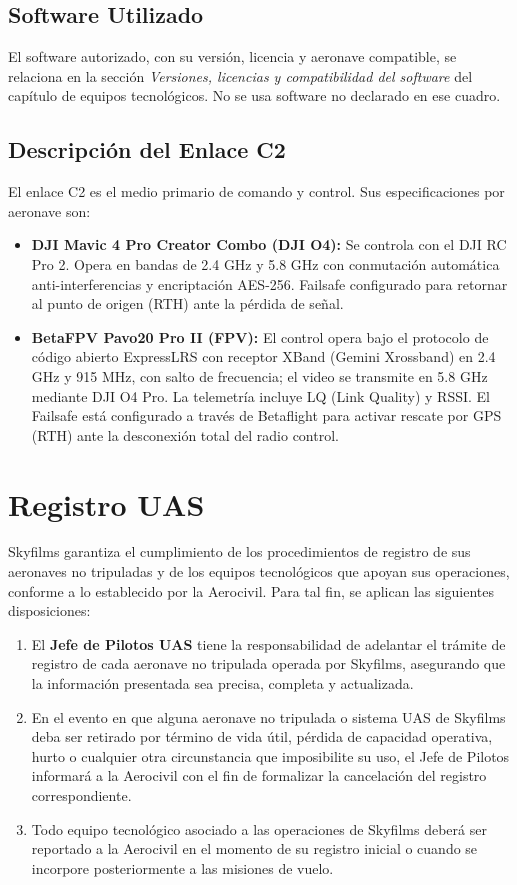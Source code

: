 \subsection{Software Utilizado}
El software autorizado, con su versión, licencia y aeronave compatible, se relaciona en la sección \textit{Versiones, licencias y compatibilidad del software} del capítulo de equipos tecnológicos. No se usa software no declarado en ese cuadro.

\subsection{Descripción del Enlace C2}
El enlace C2 es el medio primario de comando y control. Sus especificaciones por aeronave son:
\begin{itemize}
    \item \textbf{DJI Mavic 4 Pro Creator Combo (DJI O4):} Se controla con el DJI RC Pro 2. Opera en bandas de 2.4 GHz y 5.8 GHz con conmutación automática anti-interferencias y encriptación AES-256. Failsafe configurado para retornar al punto de origen (RTH) ante la pérdida de señal.
    \item \textbf{BetaFPV Pavo20 Pro II (FPV):} El control opera bajo el protocolo de código abierto ExpressLRS con receptor XBand (Gemini Xrossband) en 2.4 GHz y 915 MHz, con salto de frecuencia; el video se transmite en 5.8 GHz mediante DJI O4 Pro. La telemetría incluye LQ (Link Quality) y RSSI. El Failsafe está configurado a través de Betaflight para activar rescate por GPS (RTH) ante la desconexión total del radio control.
\end{itemize}



\section{Registro UAS}


Skyfilms garantiza el cumplimiento de los procedimientos de registro de sus aeronaves no tripuladas y de los equipos tecnológicos que apoyan sus operaciones, conforme a lo establecido por la Aerocivil. Para tal fin, se aplican las siguientes disposiciones:

\begin{enumerate}[label=\alph*)]
    \item El \textbf{Jefe de Pilotos UAS} tiene la responsabilidad de adelantar el trámite de registro de cada aeronave no tripulada operada por Skyfilms, asegurando que la información presentada sea precisa, completa y actualizada.
    \item En el evento en que alguna aeronave no tripulada o sistema UAS de Skyfilms deba ser retirado por término de vida útil, pérdida de capacidad operativa, hurto o cualquier otra circunstancia que imposibilite su uso, el Jefe de Pilotos informará a la Aerocivil con el fin de formalizar la cancelación del registro correspondiente.
    \item Todo equipo tecnológico asociado a las operaciones de Skyfilms deberá ser reportado a la Aerocivil en el momento de su registro inicial o cuando se incorpore posteriormente a las misiones de vuelo.
\end{enumerate}

